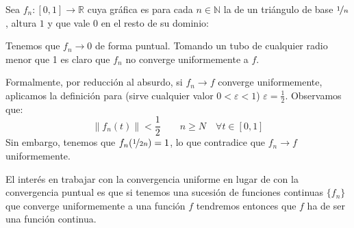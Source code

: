 \begin{ejemplo} 
    Sea $f_n:[0,1]\to \mathbb{R}$ cuya gráfica es para cada $n\in \mathbb{N}$ la de un triángulo de base $\nicefrac{1}{n}$, altura $1$ y que vale $0$ en el resto de su dominio:
    \begin{figure}[H]
        \centering
    \end{figure}
    \noindent
    Tenemos que $f_n\to 0$ de forma puntual. Tomando un tubo de cualquier radio menor que 1 es claro que $f_n$ no converge uniformemente a $f$.

    \noindent
    Formalmente, por reducción al absurdo, si $f_n\to f$ converge uniformemente, aplicamos la definición para (sirve cualquier valor $0<\varepsilon<1$) $\varepsilon=\frac{1}{2}$. Observamos que:
    \begin{equation*}
        \|f_n(t)\| < \frac{1}{2} \qquad n\geq N \quad \forall t\in [0,1]
    \end{equation*}
    Sin embargo, tenemos que $f_n(\nicefrac{1}{2n}) = 1$, lo que contradice que $f_n\to f$ uniformemente.
\end{ejemplo}

\noindent
El interés en trabajar con la convergencia uniforme en lugar de con la convergencia puntual es que si tenemos una sucesión de funciones continuas $\{f_n\}$ que converge uniformemente a una función $f$ tendremos entonces que $f$ ha de ser una función continua.


